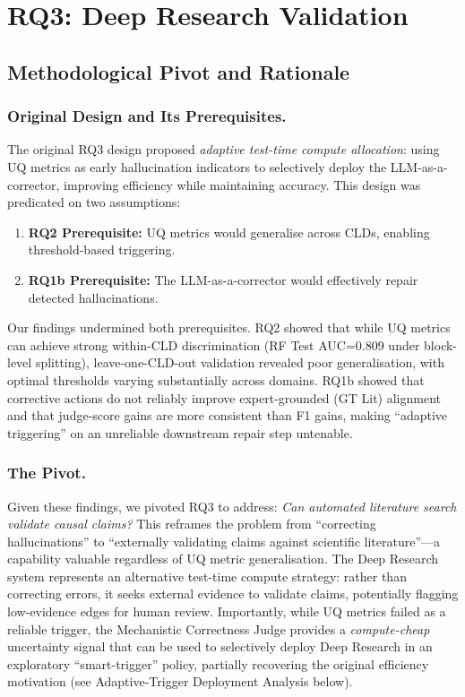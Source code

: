\section{RQ3: Deep Research Validation}
\label{sec:discussion_rq3}
\label{sec:rq3_pivot}

\subsection{Methodological Pivot and Rationale}

\subsubsection{Original Design and Its Prerequisites.}
The original RQ3 design proposed \textit{adaptive test-time compute allocation}: using UQ metrics as early hallucination indicators to selectively deploy the LLM-as-a-corrector, improving efficiency while maintaining accuracy. This design was predicated on two assumptions:
\begin{enumerate}[noitemsep]
    \item \textbf{RQ2 Prerequisite:} UQ metrics would generalise across CLDs, enabling threshold-based triggering.
    \item \textbf{RQ1b Prerequisite:} The LLM-as-a-corrector would effectively repair detected hallucinations.
\end{enumerate}

\noindent Our findings undermined both prerequisites. RQ2 showed that while UQ metrics can achieve strong within-CLD discrimination (RF Test AUC=0.809 under block-level splitting), leave-one-CLD-out validation revealed poor generalisation, with optimal thresholds varying substantially across domains. RQ1b showed that corrective actions do not reliably improve expert-grounded (GT Lit) alignment and that judge-score gains are more consistent than F1 gains, making ``adaptive triggering'' on an unreliable downstream repair step untenable.

\subsubsection{The Pivot.}
Given these findings, we pivoted RQ3 to address: \textit{Can automated literature search validate causal claims?} This reframes the problem from ``correcting hallucinations'' to ``externally validating claims against scientific literature''---a capability valuable regardless of UQ metric generalisation. The Deep Research system represents an alternative test-time compute strategy: rather than correcting errors, it seeks external evidence to validate claims, potentially flagging low-evidence edges for human review. Importantly, while UQ metrics failed as a reliable trigger, the Mechanistic Correctness Judge provides a \textit{compute-cheap} uncertainty signal that can be used to selectively deploy Deep Research in an exploratory ``smart-trigger'' policy, partially recovering the original efficiency motivation (see Adaptive-Trigger Deployment Analysis below).

